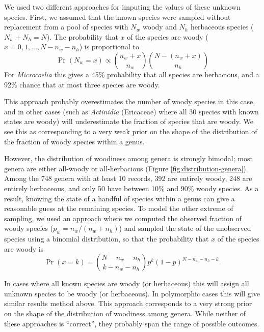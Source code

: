 \documentclass[12pt]{article}
\begin{document}
We used two different approaches for imputing the values of these
unknown species.  First, we assumed that the known species were
sampled without replacement from a pool of species with $N_w$ woody
and $N_h$ herbaceous species ($N_w + N_h = N$).  The probability that
$x$ of the species are woody ($x = 0, 1, \ldots, N - n_w - n_h$) is
proportional to
\begin{equation}
  \Pr(N_w = x) \propto {n_w + x \choose n_w}
  {N - (n_w + x) \choose n_h}
\end{equation}
For \textit{Microcoelia} this gives a 45\% probability that all
species are herbacious, and a 92\% chance that at most three species
are woody.

This approach probably overestimates the number of woody species in
this case, and in other cases (such as \textit{Actinidia} (Ericaceae)
where all 30 species with known states are woody) will underestimate
the fraction of species that are woody.  We see this as corresponding
to a very weak prior on the shape of the distribution of the fraction
of woody species within a genus.

However, the distribution of woodiness among genera is strongly
bimodal; most genera are either all-woody or all-herbacious (Figure
\ref{fig:distribution-genera}).  Among the 748 genera with at least 10
records, 392 are entirely woody, 248 are entirely herbaceous, and only
50 have between 10\% and 90\% woody species.  As a result, knowing the
state of a handful of species within a genus can give a reasonable
guess at the remaining species.
To model the other extreme of sampling, we used an approach where we
computed the observed fraction of woody species ($p_w = n_w / (n_w +
n_h)$) and sampled the state of the unobserved species using a
binomial distribution, so that the probability that $x$ of the species
are woody is
\begin{equation}
  \Pr(x = k) = {N - n_w - n_h \choose k - n_w - n_h} 
  p^k (1-p)^{N - n_w - n_h - k}.
\end{equation}

In cases where all known species are woody (or herbaceous) this will
assign all unknown species to be woody (or herbaceous).  In
polymorphic cases this will give similar results method above.  This
approach corresponds to a very strong prior on the shape of the
distribution of woodiness among genera.
While neither of these approaches is ``correct'', they probably
span the range of possible outcomes.
\end{document}
